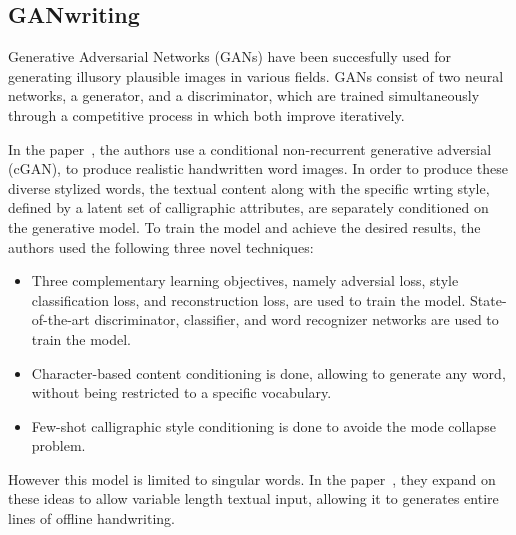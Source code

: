 \documentclass[10pt,twocolumn,letterpaper]{article}
\begin{document}
\subsection{GANwriting}
\label{subsec: GANWriting}
Generative Adversarial Networks (GANs) have been succesfully used for generating illusory plausible images in various fields. GANs consist of two neural networks, a generator, and a discriminator, which are trained simultaneously through a competitive process in which both improve iteratively. 

In the paper~\cite{GAN-1}, the authors use a conditional non-recurrent generative adversial (cGAN), to produce realistic handwritten word images. In order to produce these diverse stylized words, the textual content along with the specific wrting style, defined by a latent set of calligraphic attributes, are separately conditioned on the generative model. To train the model and achieve the desired results, the authors used the following three novel techniques:
\begin{itemize}
    \item Three complementary learning objectives, namely adversial loss, style classification loss, and reconstruction loss, are used to train the model. State-of-the-art discriminator, classifier, and word recognizer networks are used to train the model.
    \item Character-based content conditioning is done, allowing to generate any word, without being restricted to a specific vocabulary.
    \item Few-shot calligraphic style conditioning is done to avoide the mode collapse problem.
\end{itemize}


However this model is limited to singular words. In the paper~\cite{GAN-2}, they expand on these ideas to allow variable length  textual input, allowing it to generates entire lines of offline handwriting.
\end{document}
